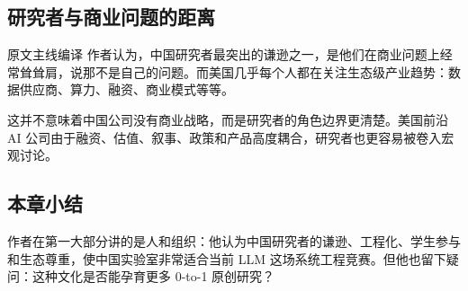 \subsection{研究者与商业问题的距离}

\begin{translationbox}{原文主线编译}
作者认为，中国研究者最突出的谦逊之一，是他们在商业问题上经常耸耸肩，说那不是自己的问题。而美国几乎每个人都在关注生态级产业趋势：数据供应商、算力、融资、商业模式等等。
\end{translationbox}

这并不意味着中国公司没有商业战略，而是研究者的角色边界更清楚。美国前沿 AI 公司由于融资、估值、叙事、政策和产品高度耦合，研究者也更容易被卷入宏观讨论。

\subsection{本章小结}

作者在第一大部分讲的是人和组织：他认为中国研究者的谦逊、工程化、学生参与和生态尊重，使中国实验室非常适合当前 LLM 这场系统工程竞赛。但他也留下疑问：这种文化是否能孕育更多 0-to-1 原创研究？


